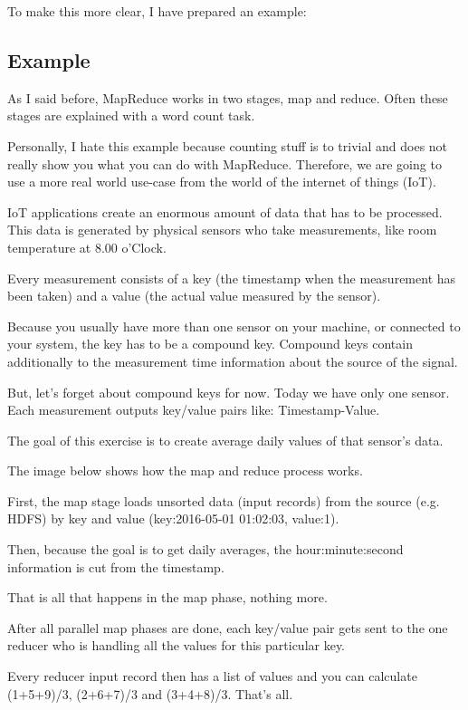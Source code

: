 \documentclass[12pt, numbers=noenddot]{scrreprt} %
\begin{document}
To make this more clear, I have prepared an example:

\subsection{Example}
As I said before, MapReduce works in two stages, map and reduce. Often these stages are explained with a word count task.

Personally, I hate this example because counting stuff is to trivial and does not really show you what you can do with MapReduce. Therefore, we are going to use a more real world use-case from the world of the internet of things (IoT).

IoT applications create an enormous amount of data that has to be processed. This data is generated by physical sensors who take measurements, like room temperature at 8.00 o’Clock.

Every measurement consists of a key (the timestamp when the measurement has been taken) and a value (the actual value measured by the sensor).

Because you usually have more than one sensor on your machine, or connected to your system, the key has to be a compound key. Compound keys contain additionally to the measurement time information about the source of the signal.

But, let’s forget about compound keys for now. Today we have only one sensor. Each measurement outputs key/value pairs like: Timestamp-Value.

The goal of this exercise is to create average daily values of that sensor’s data.

The image below shows how the map and reduce process works.

First, the map stage loads unsorted data (input records) from the source (e.g. HDFS) by key and value (key:2016-05-01 01:02:03, value:1).

Then, because the goal is to get daily averages, the hour:minute:second information is cut from the timestamp.

That is all that happens in the map phase, nothing more.

After all parallel map phases are done, each key/value pair gets sent to the one reducer who is handling all the values for this particular key.

Every reducer input record then has a list of values and you can calculate (1+5+9)/3, (2+6+7)/3 and (3+4+8)/3. That’s all.
\end{document}
